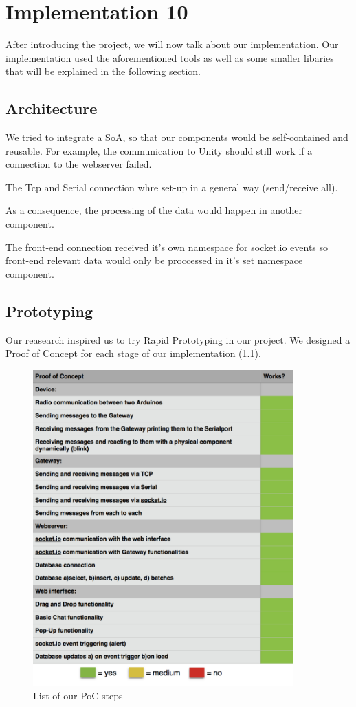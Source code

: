 
\chapter{Implementation 10} %
\label{Chapter4} %

After introducing the project, we will now talk about our implementation.
Our implementation used the aforementioned tools as well as some smaller libaries that will be explained in the following section.
\section{Architecture}
We tried to integrate a SoA, so that our components would be self-contained and reusable. 
For example, the communication to Unity should still work if a connection to the webserver failed.

The Tcp and Serial connection whre set-up in a general way (send/receive all). 

As a consequence, the processing of the data would happen in another component.

The front-end connection received it's own namespace for socket.io events so front-end relevant data 
would only be proccessed in it's set namespace component.
\section{Prototyping}
Our reasearch inspired us to try Rapid Prototyping in our project. 
We designed a Proof of Concept for each stage of our implementation (\ref{fig:PoC}).
\begin{figure}[th]
	\centering
	\includegraphics[width=100mm,scale=1]{Figures/PoC}
	\decoRule
	\caption[PoC]{List of our PoC steps}
	\label{fig:PoC}
\end{figure}

